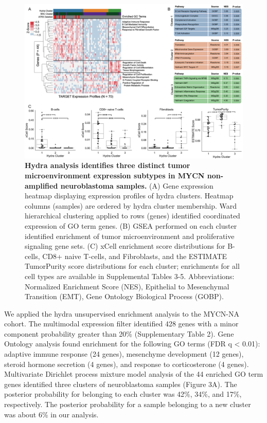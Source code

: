 \documentclass[10pt,letterpaper]{article}
\begin{document}
\begin{figure}[!h]
	\includegraphics[width=\textwidth]{img/MYCN-NA-Figure-V5@2x}
	\caption{{\bf Hydra analysis identifies three distinct tumor microenvironment expression subtypes in MYCN non-amplified neuroblastoma samples.}
		(A) Gene expression heatmap displaying expression profiles of hydra clusters. Heatmap columns (samples) are ordered by hydra cluster membership. Ward hierarchical clustering applied to rows (genes) identified coordinated expression of GO term genes. (B) GSEA performed on each cluster identified enrichment of tumor microenvironment and proliferative signaling gene sets. (C) xCell enrichment score distributions for B-cells, CD8+ naive T-cells, and Fibroblasts, and the ESTIMATE TumorPurity score distributions for each cluster; enrichments for all cell types are available in Supplemental Tables 3-5. Abbreviations: Normalized Enrichment Score (NES), Epithelial to Mesenchymal Transition (EMT), Gene Ontology Biological Process (GOBP).
		\label{MYCN-NA}}
\end{figure}

We applied the hydra unsupervised enrichment analysis to the MYCN-NA cohort. The multimodal expression filter identified 428 genes with a minor component probability greater than 20\% (Supplementary Table 2). Gene Ontology analysis found enrichment for the following GO terms (FDR q < 0.01): adaptive immune response (24 genes), mesenchyme development (12 genes), steroid hormone secretion (4 genes), and response to corticosterone (4 genes). Multivariate Dirichlet process mixture model analysis of the 44 enriched GO term genes identified three clusters of neuroblastoma samples (Figure 3A). The posterior probability for belonging to each cluster was 42\%, 34\%, and 17\%, respectively. The posterior probability for a sample belonging to a new cluster was about 6\% in our analysis. 
\end{document}
